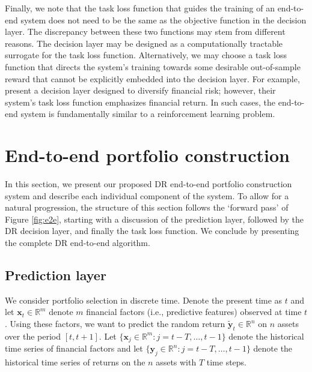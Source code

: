 \documentclass[10pt, twocolumn]{article}
\theoremstyle{plain}
\theoremstyle{definition}
\begin{document}
Finally, we note that the task loss function that guides the training of 
an end-to-end system does not need to be the same as the objective function 
in the decision layer. The discrepancy between these two functions may stem 
from different reasons. The decision layer may be designed as a 
computationally tractable surrogate for the task loss function. Alternatively, 
we may choose a task loss function that directs the system's training towards 
some desirable out-of-sample reward that cannot be explicitly embedded into 
the decision layer. For example, \citet{uysal2021end} present a decision 
layer designed to diversify financial risk; however, their system's task loss 
function emphasizes financial return. In such cases, the end-to-end system is 
fundamentally similar to a reinforcement learning problem. 

\section{End-to-end portfolio construction}\label{sec:e2e}

In this section, we present our proposed DR end-to-end portfolio construction 
system and describe each individual component of the system. To allow for a 
natural progression, the structure of this section follows the `forward pass' 
of Figure \ref{fig:e2e}, starting with a discussion of the prediction layer, 
followed by the DR decision layer, and finally the task loss function. We 
conclude by presenting the complete DR end-to-end algorithm.   

\subsection{Prediction layer}\label{sec:pred}

We consider portfolio selection in discrete time. Denote the present time as 
\(t\) and let \(\bm{x}_t \in \mathbb{R}^m\) denote \(m\) financial factors 
(i.e., predictive features) observed at time \(t\). Using these factors, we 
want to predict the random return \(\tilde{\bm{y}}_t \in \mathbb{R}^n\) on
\(n\) assets over the period \([t,t+1]\).  Let \(\{\bm{x}_{j} \in \mathbb{R}^m: j =
t-T, \ldots, t-1\}\) denote the historical time series of
financial factors and let \(\{\bm{y}_{j} \in \mathbb{R}^n: j = 
t-T,\dots,t-1\}\) denote the historical time series of returns on the
\(n\) assets with \(T\) time steps.
\end{document}
